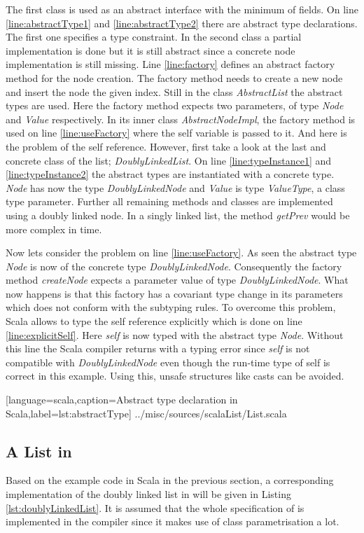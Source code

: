The first class is used as an abstract interface with the minimum of fields.
On line \ref{line:abstractType1} and \ref{line:abstractType2} there are
abstract type declarations. The first one specifies a type constraint. 
In the second class a partial implementation is done but it is
still abstract since a concrete node implementation is still missing. Line
\ref{line:factory} defines an abstract factory method for the node
creation. The factory method needs to create a new node and insert the
node the given index. Still in the class \emph{AbstractList} the abstract
types are used. Here the factory method expects two parameters, of type
\emph{Node} and \emph{Value} respectively. In its inner class \emph{AbstractNodeImpl},
the factory method is used on line \ref{line:useFactory} where the
self variable is passed to it. And here is the problem of the self
reference. However, first take a look at the last and concrete class
of the list; \emph{DoublyLinkedList}. On line \ref{line:typeInstance1}
and \ref{line:typeInstance2} the abstract types are instantiated with
a concrete type. \emph{Node} has now the type \emph{DoublyLinkedNode} and
\emph{Value} is type \emph{ValueType}, a class type parameter. Further all
remaining methods and classes are implemented using a doubly linked node.
In a singly linked list, the method \emph{getPrev} would be more complex
in time.

Now lets consider the problem on line \ref{line:useFactory}. As
seen the abstract type \emph{Node} is now of the concrete
type \emph{DoublyLinkedNode}. Consequently the factory
method \emph{createNode} expects a parameter value of type
\emph{DoublyLinkedNode}. What now happens is that this factory has a
covariant type change in its parameters which does not conform with the
subtyping rules. To overcome this problem, Scala allows to type the
self reference explicitly which is done on line \ref{line:explicitSelf}.
Here \emph{self} is now typed with the abstract type \emph{Node}. Without this
line the Scala compiler returns with a typing error since \emph{self} is not
compatible with \emph{DoublyLinkedNode} even though the run-time
type of self is correct in this example. Using this, unsafe structures
like casts can be avoided.


[language=scala,caption=Abstract type declaration in Scala,label=lst:abstractType]
{../misc/sources/scalaList/List.scala}

\subsection{A List in \ooplss}
Based on the example code in Scala in the previous section, a corresponding 
implementation of the doubly linked list in \ooplss will be given in Listing
\ref{lst:doublyLinkedList}. It is assumed that the whole specification
of \ooplss is implemented in the compiler since it makes  use
of class parametrisation a lot.

